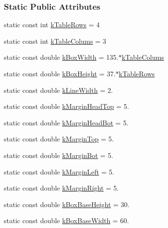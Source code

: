 \subsubsection*{Static Public Attributes}
\begin{DoxyCompactItemize}
\item 
static const int \hyperlink{class_info_line_a95cdc7a95cde6db7c6faceda995d26b9}{k\+Table\+Rows} = 4
\item 
static const int \hyperlink{class_info_line_a9fc071b08eb913cf3afc623835ad2fd8}{k\+Table\+Colums} = 3
\item 
static const double \hyperlink{class_info_line_a33821aa140dc03829357d4006e9c153c}{k\+Box\+Width} = 135.$\ast$\hyperlink{class_info_line_a9fc071b08eb913cf3afc623835ad2fd8}{k\+Table\+Colums}
\item 
static const double \hyperlink{class_info_line_a9e459549795bab79ae3b6c184dc78a00}{k\+Box\+Height} = 37.$\ast$\hyperlink{class_info_line_a95cdc7a95cde6db7c6faceda995d26b9}{k\+Table\+Rows}
\item 
static const double \hyperlink{class_info_line_ad072bc8ef178113c36c3d480c7d637ac}{k\+Line\+Width} = 2.
\item 
static const double \hyperlink{class_info_line_a73e02db68396f0c4b66d0cf80bd37c83}{k\+Margin\+Head\+Top} = 5.
\item 
static const double \hyperlink{class_info_line_a82ed1944ec4a41af19e377a243c2332d}{k\+Margin\+Head\+Bot} = 5.
\item 
static const double \hyperlink{class_info_line_a995100424420038664880195f5e51f50}{k\+Margin\+Top} = 5.
\item 
static const double \hyperlink{class_info_line_ab4bd85105aabcb9d1230225c15873da2}{k\+Margin\+Bot} = 5.
\item 
static const double \hyperlink{class_info_line_a68232e6e5e3b63a4b6aced3d99291ad7}{k\+Margin\+Left} = 5.
\item 
static const double \hyperlink{class_info_line_a0f0bd713ed9c1c8012bbd29dbd1db75e}{k\+Margin\+Right} = 5.
\item 
static const double \hyperlink{class_info_line_ab50f47aa54c45def219859e9da3755e6}{k\+Box\+Base\+Height} = 30.
\item 
static const double \hyperlink{class_info_line_aad905589137b80ba75d9a1c49535eb1a}{k\+Box\+Base\+Width} = 60.
\end{DoxyCompactItemize}
